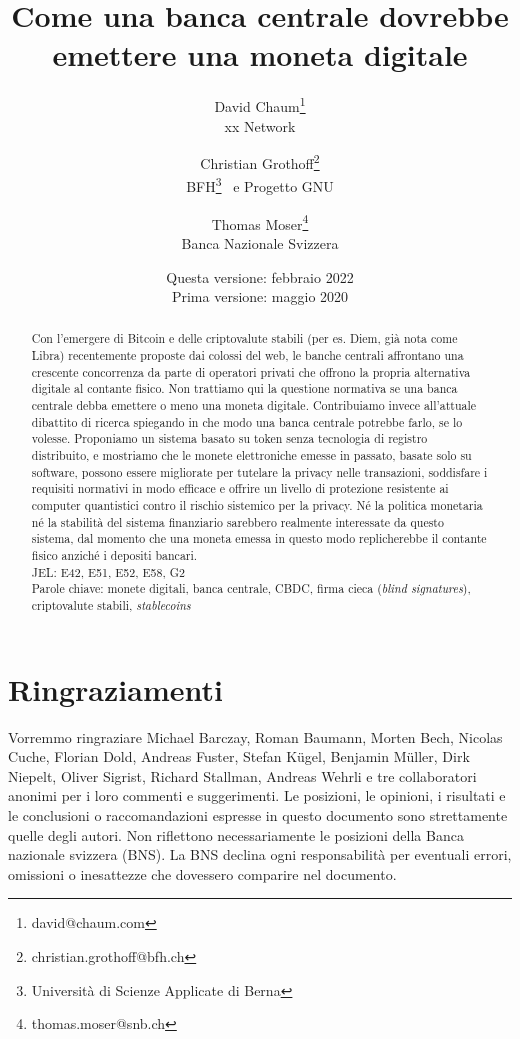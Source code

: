 \documentclass[a4paper]{article}
\title{Come una banca centrale dovrebbe emettere una moneta digitale}
\author{David Chaum\footnote{david@chaum.com} \\
  xx Network \and
  Christian Grothoff\footnote{christian.grothoff@bfh.ch} \\
  BFH\footnote{Università di Scienze Applicate di Berna}
  \ e Progetto GNU \and
  Thomas Moser\footnote{thomas.moser@snb.ch} \\
  Banca Nazionale Svizzera}
\date{Questa versione: febbraio 2022 \\
      Prima versione:  maggio 2020}
\begin{document}
\maketitle

\begin{abstract}
Con l'emergere di Bitcoin e delle criptovalute stabili (per es. Diem,
già nota come Libra) recentemente proposte dai colossi del web, le
banche centrali affrontano una crescente concorrenza da parte di
operatori privati che offrono la propria alternativa digitale al
contante fisico. Non trattiamo qui la questione normativa se una banca
centrale debba emettere o meno una moneta digitale. Contribuiamo invece
all'attuale dibattito di ricerca spiegando in che modo una banca centrale
potrebbe farlo, se lo volesse. Proponiamo un sistema basato su token
senza tecnologia di registro distribuito, e mostriamo che le monete
elettroniche emesse in passato, basate solo su software, possono essere
migliorate per tutelare la privacy nelle transazioni, soddisfare i
requisiti normativi in modo efficace e offrire un livello di protezione
resistente ai computer quantistici contro il rischio sistemico per
la privacy. Né la politica monetaria né la stabilità del sistema
finanziario sarebbero realmente interessate da questo sistema, dal
momento che una moneta emessa in questo modo replicherebbe il contante
fisico anziché i depositi bancari. \\

JEL: E42, E51, E52, E58, G2
\\

Parole chiave: monete digitali, banca centrale, CBDC, firma cieca (\textit{blind signatures}),
criptovalute stabili, \textit{stablecoins}
\end{abstract}

\vspace{40pt}

\section*{Ringraziamenti}
Vorremmo ringraziare Michael Barczay, Roman Baumann, Morten Bech,
Nicolas Cuche, Florian Dold, Andreas Fuster, Stefan Kügel, Benjamin
Müller, Dirk Niepelt, Oliver Sigrist, Richard Stallman, Andreas Wehrli
e tre collaboratori anonimi per i loro commenti e suggerimenti. Le
posizioni, le opinioni, i risultati e le conclusioni o raccomandazioni
espresse in questo documento sono strettamente quelle degli autori.
Non riflettono necessariamente le posizioni della Banca nazionale
svizzera (BNS). La BNS declina ogni responsabilità per eventuali
errori, omissioni o inesattezze che dovessero comparire nel documento.
\end{document}
